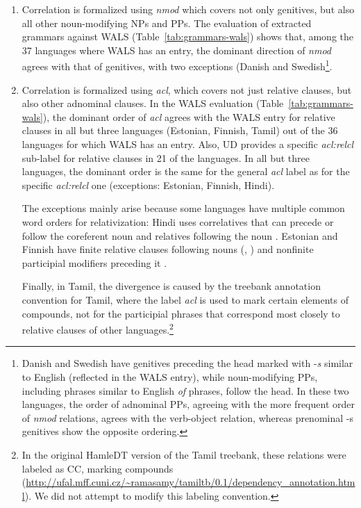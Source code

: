 \documentclass[10pt,twoside,lineno]{article}
\begin{document}
\begin{enumerate}
\item Correlation  is formalized using \emph{nmod} which covers not only genitives, but also all other noun-modifying NPs and PPs.
The evaluation of extracted grammars against WALS (Table~\ref{tab:grammars-wals}) shows that, among the 37 languages where WALS has an entry, the dominant direction of \emph{nmod} agrees with that of genitives, with two exceptions (Danish and Swedish\footnote{Danish and Swedish have genitives preceding the head marked with -\emph{s} similar to English (reflected in the WALS entry), while noun-modifying PPs, including phrases similar to English \emph{of} phrases, follow the head. In these two languages, the order of adnominal PPs, agreeing with the more frequent order of \emph{nmod} relations, agrees with the verb-object relation, whereas prenominal -s genitives show the opposite ordering.}.

\item Correlation  is formalized using \emph{acl}, which covers not just relative clauses, but also other adnominal clauses.
In the WALS evaluation (Table~\ref{tab:grammars-wals}), the dominant order of \emph{acl} agrees with the WALS entry for relative clauses in all but three languages (Estonian, Finnish, Tamil) out of the 36 languages for which WALS has an entry.
Also, UD provides a specific \emph{acl:relcl} sub-label for relative clauses in 21 of the languages.
In all but three languages, the dominant order is the same for the general \emph{acl} label as for the specific \emph{acl:relcl} one (exceptions: Estonian, Finnish, Hindi).

The exceptions mainly arise because some languages have multiple common word orders for relativization:
Hindi uses correlatives that can precede or follow the coreferent noun \citep[3.1.3]{montaut2004grammar} and relatives following the noun \citep[4.3]{montaut2004grammar}.
Estonian and Finnish have finite relative clauses following nouns (\citep[p. 176]{karlsson2013finnish}, \citep[p. 256]{tauli1983standard}) and nonfinite participial modifiers preceding it \citep[Chapter 18]{karlsson2013finnish}.

		Finally, in Tamil, the divergence is caused by the treebank annotation convention for Tamil, where the label \emph{acl} is used to mark certain elements of compounds, not for the participial phrases that correspond most closely to relative clauses of other languages.\footnote{In the original HamleDT \citep{zeman2012hamledt, Ramasamy:2011:TDP:1964799.1964808} version of the Tamil treebank, these relations were labeled as CC, marking compounds (\url{http://ufal.mff.cuni.cz/~ramasamy/tamiltb/0.1/dependency_annotation.html}). We did not attempt to modify this labeling convention.}
	


\end{enumerate}
\end{document}

